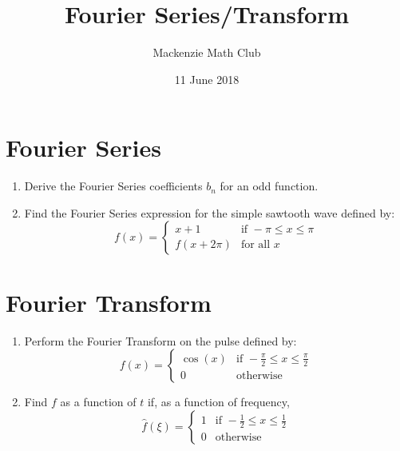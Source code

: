 

\title{Fourier Series/Transform}
\author{Mackenzie Math Club}
\date{11 June 2018}



\section{Fourier Series}
\begin{enumerate}
	\item{Derive the Fourier Series coefficients $b_n$ for an odd function.}
		\vspace*{3.5in}
	\item{Find the Fourier Series expression for the simple sawtooth wave defined by:
			\begin{equation*}
				f(x)=\begin{cases}
					x+1&\text{if }-\pi\leq x\leq\pi\\
					f(x+2\pi)&\text{for all }x
				\end{cases}
			\end{equation*}}
		\newpage
\end{enumerate}
\section{Fourier Transform}
\begin{enumerate}
	\item{Perform the Fourier Transform on the pulse defined by:
			\begin{equation*}
				f(x)=\begin{cases}
					\cos(x)&\text{if }-\frac{\pi}{2}\leq x\leq\frac{\pi}{2}\\
					0&\text{otherwise}
				\end{cases}
			\end{equation*}}
			\vspace*{3.5in}
		\item{Find $f$ as a function of $t$ if, as a function of frequency,
			\begin{equation*}
				\hat{f}(\xi) = \begin{cases}
					1&\text{if }-\frac{1}{2}\leq x\leq\frac{1}{2}\\
					0&\text{otherwise}
				\end{cases}
			\end{equation*}
		}
\end{enumerate}

